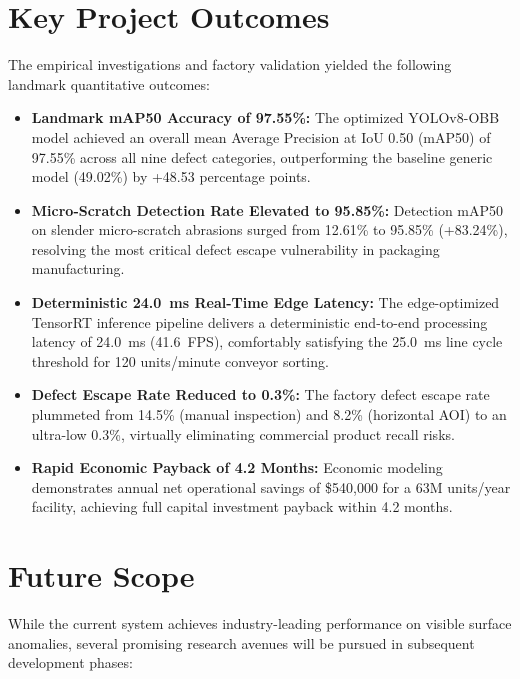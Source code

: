 \section*{Key Project Outcomes}

The empirical investigations and factory validation yielded the following landmark quantitative outcomes:

\begin{itemize}
\item \textbf{Landmark mAP50 Accuracy of 97.55\%:} The optimized YOLOv8-OBB model achieved an overall mean Average Precision at IoU 0.50 (mAP50) of 97.55\% across all nine defect categories, outperforming the baseline generic model (49.02\%) by +48.53 percentage points.
\item \textbf{Micro-Scratch Detection Rate Elevated to 95.85\%:} Detection mAP50 on slender micro-scratch abrasions surged from 12.61\% to 95.85\% (+83.24\%), resolving the most critical defect escape vulnerability in packaging manufacturing.
\item \textbf{Deterministic 24.0~ms Real-Time Edge Latency:} The edge-optimized TensorRT inference pipeline delivers a deterministic end-to-end processing latency of 24.0~ms (41.6~FPS), comfortably satisfying the 25.0~ms line cycle threshold for 120 units/minute conveyor sorting.
\item \textbf{Defect Escape Rate Reduced to 0.3\%:} The factory defect escape rate plummeted from 14.5\% (manual inspection) and 8.2\% (horizontal AOI) to an ultra-low 0.3\%, virtually eliminating commercial product recall risks.
\item \textbf{Rapid Economic Payback of 4.2 Months:} Economic modeling demonstrates annual net operational savings of \$540,000 for a 63M units/year facility, achieving full capital investment payback within 4.2 months.
\end{itemize}

\section{Future Scope}
\label{sec:future}

While the current system achieves industry-leading performance on visible surface anomalies, several promising research avenues will be pursued in subsequent development phases:


